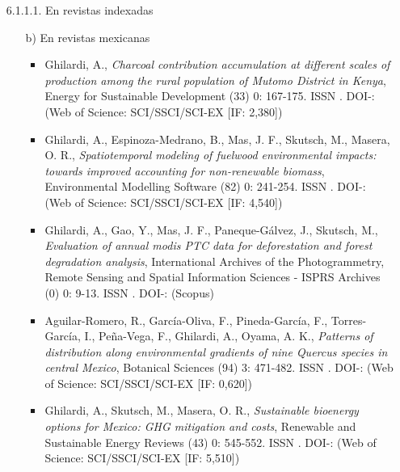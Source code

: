 \documentclass[12pt]{report}
\begin{document}
\begin{enumerate}
\begin{enumerate}
{\begin{enumerate}
\begin{enumerate}
                                                        \item[6.1.1.1.] En revistas indexadas
                                                                \begin{itemize}


                                                                            \item[b)] En revistas mexicanas
                                                                                \begin{itemize}

                                                                                        \item{  Ghilardi, A., \textit{ Charcoal contribution accumulation at different scales of production among the rural population of Mutomo District in Kenya}, Energy for Sustainable Development (33) 0: 167-175. ISSN . DOI-:  (Web of Science: SCI/SSCI/SCI-EX [IF: 2,380])}

                                                                                        \item{  Ghilardi, A., Espinoza-Medrano, B., Mas, J. F., Skutsch, M., Masera, O. R., \textit{ Spatiotemporal modeling of fuelwood environmental impacts: towards improved accounting for non-renewable biomass}, Environmental Modelling  Software (82) 0: 241-254. ISSN . DOI-:  (Web of Science: SCI/SSCI/SCI-EX [IF: 4,540])}

                                                                                        \item{  Ghilardi, A., Gao, Y., Mas, J. F., Paneque-Gálvez, J., Skutsch, M., \textit{ Evaluation of annual modis PTC data for deforestation and forest degradation analysis}, International Archives of the Photogrammetry, Remote Sensing and Spatial Information Sciences - ISPRS Archives (0) 0: 9-13. ISSN . DOI-:  (Scopus)}

                                                                                        \item{  Aguilar-Romero, R., García-Oliva, F., Pineda-García, F., Torres-García, I., Peña-Vega, F., Ghilardi, A., Oyama, A. K., \textit{ Patterns of distribution along environmental gradients of nine Quercus species in central Mexico}, Botanical Sciences (94) 3: 471-482. ISSN . DOI-:  (Web of Science: SCI/SSCI/SCI-EX [IF: 0,620])}

                                                                                        \item{  Ghilardi, A., Skutsch, M., Masera, O. R., \textit{ Sustainable bioenergy options for Mexico: GHG mitigation and costs}, Renewable and Sustainable Energy Reviews (43) 0: 545-552. ISSN . DOI-:  (Web of Science: SCI/SSCI/SCI-EX [IF: 5,510])}


\end{itemize}
\end{itemize}
\end{enumerate}
\end{enumerate}}
\end{enumerate}
\end{enumerate}
\end{document}
